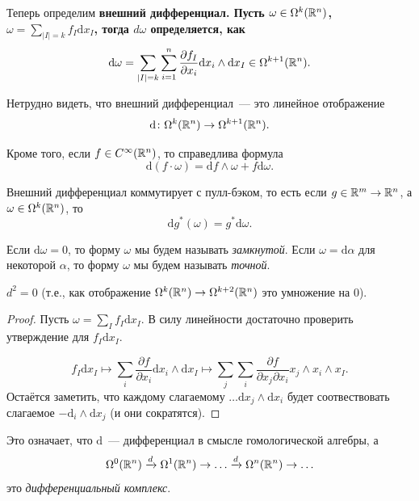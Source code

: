 	Теперь определим \bf{внешний дифференциал}. Пусть $\omega \in \Omega^k(\mathbb{R}^n)$, $\omega = \sum_{|I| = k} f_{I} \mathrm{d}x_{I}$, тогда $d\omega$ определяется, как 
	\[
		\mathrm{d}\omega = \sum_{|I| = k} \sum_{i = 1}^{n} \frac{\partial f_{I}}{\partial x_{i}} \mathrm{d}x_i \wedge \mathrm{d}x_{I} \in \Omega^{k + 1}(\mathbb{R}^n). 
	\]

	Нетрудно видеть, что внешний дифференциал~--- это линейное отображение 
	\[
		\mathrm{d} \colon \Omega^k(\mathbb{R}^n) \to \Omega^{k + 1}(\mathbb{R}^n).
	\]

	Кроме того, если $f \in C^{\infty}(\mathbb{R}^n)$, то справедлива формула 
	\[
		\mathrm{d}(f\cdot \omega) = \mathrm{d}f \wedge \omega + f \mathrm{d}\omega.
	\]

	\begin{homework} Внешний дифференциал коммутирует с пулл-бэком, то есть если $g \in \mathbb{R}^m \to \mathbb{R}^n$, а $\omega \in \Omega^k(\mathbb{R}^n)$, то 
	\[
		\mathrm{d}g^*(\omega) = g^{*}\mathrm{d}\omega. 
	\]
	\end{homework}

	\begin{definition} 
		Если $\mathrm{d} \omega = 0$, то форму $\omega$ мы будем называть \emph{замкнутой}. Если $\omega = \mathrm{d}\alpha$ для некоторой $\alpha$, то форму $\omega$ мы будем называть \emph{точной}. 
	\end{definition}

	\begin{lemma} 
		$d^{2} = 0$ (т.е., как отображение $\Omega^k(\mathbb{R}^n) \to \Omega^{k + 2}(\mathbb{R}^n)$ это умножение на 0). 
	\end{lemma}
	\begin{proof}
		Пусть $\omega = \sum_{I} f_{I} \mathrm{d}x_I$. В силу линейности достаточно проверить утверждение для $f_I \mathrm{d}x_{I}$. 

		\[ 
			f_{I} \mathrm{d}x_I \mapsto \sum_{i} \frac{\partial f}{\partial x_i} \mathrm{d}x_i \wedge \mathrm{d}x_{I} \mapsto \sum_{j} \sum_{i} \frac{\partial f}{\partial x_j \partial x_i} x_j \wedge x_i \wedge x_I.
		\]
		Остаётся заметить, что каждому слагаемому $\ldots \mathrm{d}x_j \wedge \mathrm{d}x_i $ будет соотвествовать слагаемое $- \mathrm{d}_i \wedge \mathrm{d}x_j$ (и они сократятся). 
	\end{proof}

	Это означает, что $\mathrm{d}$~--- дифференциал в смысле гомологической алгебры, а 
	\[
		\Omega^0(\mathbb{R}^n) \xrightarrow{d} \Omega^{1}(\mathbb{R}^n) \to \ldots \xrightarrow{d} \Omega^n(\mathbb{R}^n) \to \ldots
	\]
	это \emph{дифференциальный комплекс}. 

